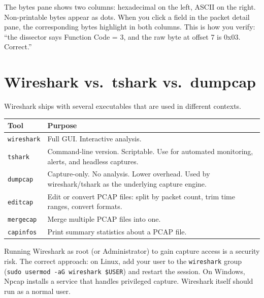 \documentclass[12pt,twoside,openright]{memoir}
\begin{document}
\begin{keyconcept}[title={Reading the Hex Dump}]
The bytes pane shows two columns: hexadecimal on the left, ASCII on the right. Non-printable bytes appear as dots. When you click a field in the packet detail pane, the corresponding bytes highlight in both columns. This is how you verify: ``the dissector says Function Code = 3, and the raw byte at offset 7 is 0x03. Correct.''
\end{keyconcept}

\section{Wireshark vs.\ tshark vs.\ dumpcap}

Wireshark ships with several executables that are used in different contexts.

\begin{center}
\begin{tabular}{L{2.5cm}L{9cm}}
\toprule
{}
\textbf{Tool} & \textbf{Purpose} \\
\midrule
\texttt{wireshark} & Full GUI. Interactive analysis. \\
\texttt{tshark} & Command-line version. Scriptable. Use for automated monitoring, alerts, and headless captures. \\
\texttt{dumpcap} & Capture-only. No analysis. Lower overhead. Used by wireshark/tshark as the underlying capture engine. \\
\texttt{editcap} & Edit or convert PCAP files: split by packet count, trim time ranges, convert formats. \\
\texttt{mergecap} & Merge multiple PCAP files into one. \\
\texttt{capinfos} & Print summary statistics about a PCAP file. \\
\bottomrule
\end{tabular}
\end{center}

\begin{warningbox}
Running Wireshark as root (or Administrator) to gain capture access is a security risk. The correct approach: on Linux, add your user to the \texttt{wireshark} group (\texttt{sudo usermod -aG wireshark \$USER}) and restart the session. On Windows, Npcap installs a service that handles privileged capture. Wireshark itself should run as a normal user.
\end{warningbox}
\end{document}
